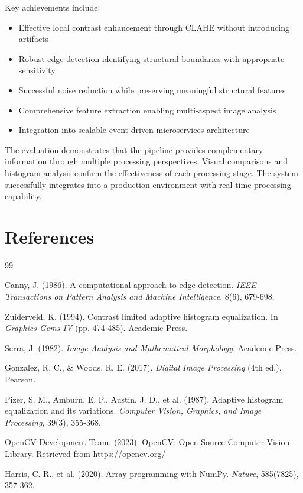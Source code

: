\documentclass[12pt,a4paper]{article}
\begin{document}
Key achievements include:

\begin{itemize}
    \item Effective local contrast enhancement through CLAHE without introducing artifacts
    \item Robust edge detection identifying structural boundaries with appropriate sensitivity
    \item Successful noise reduction while preserving meaningful structural features
    \item Comprehensive feature extraction enabling multi-aspect image analysis
    \item Integration into scalable event-driven microservices architecture
\end{itemize}

The evaluation demonstrates that the pipeline provides complementary information through multiple processing perspectives. Visual comparisons and histogram analysis confirm the effectiveness of each processing stage. The system successfully integrates into a production environment with real-time processing capability.

\newpage

\section{References}

\begin{thebibliography}{99}

 Canny, J. (1986). A computational approach to edge detection. \textit{IEEE Transactions on Pattern Analysis and Machine Intelligence}, 8(6), 679-698.

 Zuiderveld, K. (1994). Contrast limited adaptive histogram equalization. In \textit{Graphics Gems IV} (pp. 474-485). Academic Press.

 Serra, J. (1982). \textit{Image Analysis and Mathematical Morphology}. Academic Press.

 Gonzalez, R. C., \& Woods, R. E. (2017). \textit{Digital Image Processing} (4th ed.). Pearson.

 Pizer, S. M., Amburn, E. P., Austin, J. D., et al. (1987). Adaptive histogram equalization and its variations. \textit{Computer Vision, Graphics, and Image Processing}, 39(3), 355-368.

 OpenCV Development Team. (2023). OpenCV: Open Source Computer Vision Library. Retrieved from https://opencv.org/

 Harris, C. R., et al. (2020). Array programming with NumPy. \textit{Nature}, 585(7825), 357-362.

\end{thebibliography}
\end{document}
